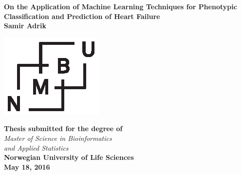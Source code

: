\documentclass[../thesis.tex]{subfiles}
\begin{document}
\begin{titlepage}
\begin{center}
\vspace*{0,5cm}\LARGE{\textbf{On the Application of Machine Learning Techniques for Phenotypic Classification and Prediction of Heart Failure}}\\[0,4cm]

\vspace*{1,5cm}\Large{\textbf{Samir Adrik}}

\vspace*{3cm}\includegraphics[scale=1.5]{../images/NMBU.eps}

\vspace{1cm}\large{\textbf{Thesis submitted for the degree of}\\[0,1cm] \textit{Master of Science in Bioinformatics\\ and Applied Statistics}}\\[0,5cm]

\large{\textbf{Norwegian University of Life Sciences}}\\[0,5cm]

\large{\textbf{May 18, 2016}}
\end{center}
\end{titlepage}

\newpage{\pagestyle{empty}\cleardoublepage}
\end{document}

